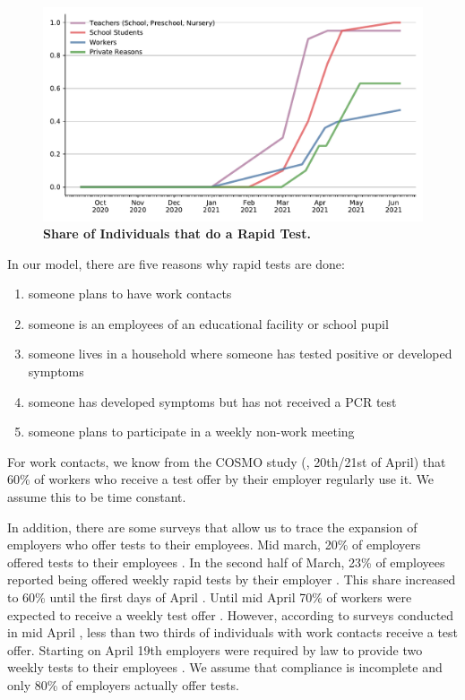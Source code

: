 \begin{figure}
    \centering
    \includegraphics[width=\textwidth]{../figures/results/figures/data/testing/rapid_test_demand_shares}
    \caption{\textbf{Share of Individuals that do a Rapid Test.}}
    \figurenotes{\textcolor{red}{J: Talk about the interpretation of each line.}}
    \label{fig:rapid_test_demand}
\end{figure}

In our model, there are five reasons why rapid tests are done:
\begin{enumerate}
    \item someone plans to have work contacts
    \item someone is an employees of an educational facility or school pupil
    \item someone lives in a household where someone has tested positive or developed
          symptoms
    \item someone has developed symptoms but has not received a PCR test
    \item someone plans to participate in a weekly non-work meeting
\end{enumerate}


For work contacts, we know from the COSMO study (\cite{Betsch2021}, 20th/21st of April)
that 60\% of workers who receive a test offer by their employer regularly use it. We
assume this to be time constant.

In addition, there are some surveys that allow us to trace the expansion of employers
who offer tests to their employees. Mid march, 20\% of employers offered tests to their
employees \citep{DIHK2021}. In the second half of March, 23\% of employees reported
being offered weekly rapid tests by their employer \citep{Ahlers2021}. This share
increased to 60\% until the first days of April \cite{ZDF2021}. Until mid April 70\% of
workers were expected to receive a weekly test offer \citep{AerzteZeitung2021}. However,
according to surveys conducted in mid April \citep{Betsch2021}, less than two thirds of
individuals with work contacts receive a test offer. Starting on April 19th employers
were required by law to provide two weekly tests to their employees
\citep{Bundesanzeiger2021}. We assume that compliance is incomplete and only 80\% of
employers actually offer tests.

